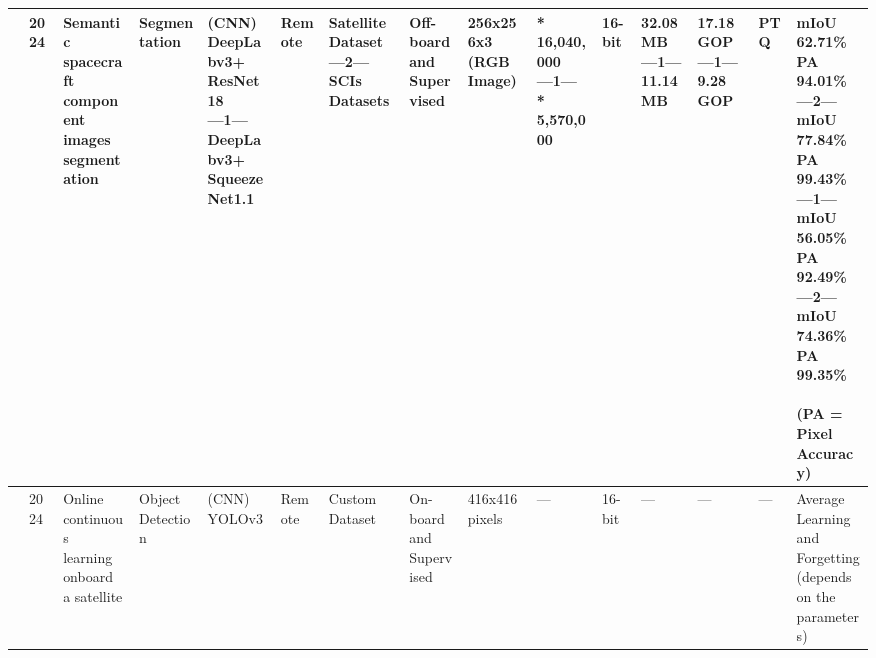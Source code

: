 \begin{center}
{\begin{tabular}{lllllllllllllll}
\cite{guoOverlayAcceleratorDeepLab2024} & 2024 & \makecell[tl]{Semantic\\ spacecraft\\ component\\ images\\ segmentation} & Segmentation & \makecell[tl]{(CNN)\\ DeepLabv3+\\ ResNet18\\ ---1---\\ DeepLabv3+\\ SqueezeNet1.1} & Remote & \makecell[tl]{Satellite Dataset\\ ---2---\\ SCIs Datasets} & \makecell[tl]{Off-board\\ and\\ Supervised} & \makecell[tl]{256x256x3\\ (RGB Image)} & \makecell[tl]{* 16,040,000\\ ---1---\\ * 5,570,000} & 16-bit & \makecell[tl]{32.08 MB\\ ---1---\\ 11.14 MB} & \makecell[tl]{17.18 GOP\\ ---1---\\ 9.28 GOP} & PTQ & \makecell[tl]{mIoU 62.71\%\\ PA 94.01\%\\ ---2---\\ mIoU 77.84\%\\ PA 99.43\%\\ ---1---\\ mIoU 56.05\%\\ PA 92.49\%\\ ---2---\\ mIoU 74.36\%\\ PA 99.35\%\\ \\ (PA =\\ Pixel Accuracy)}  \\ \hline
\cite{mazouzOnlineContinualStreaming2024} & 2024 & \makecell[tl]{Online continuous\\ learning onboard\\ a satellite} & \makecell[tl]{Object\\ Detection} & \makecell[tl]{(CNN)\\ YOLOv3} & Remote & \makecell[tl]{Custom\\ Dataset} & \makecell[tl]{On-board\\ and\\ Supervised} & \makecell[tl]{416x416\\ pixels} & --- & 16-bit & --- & --- & --- & \makecell[tl]{Average Learning\\ and Forgetting\\ (depends on the\\ parameters)} \\ \hline

\end{tabular}}
\end{center}
